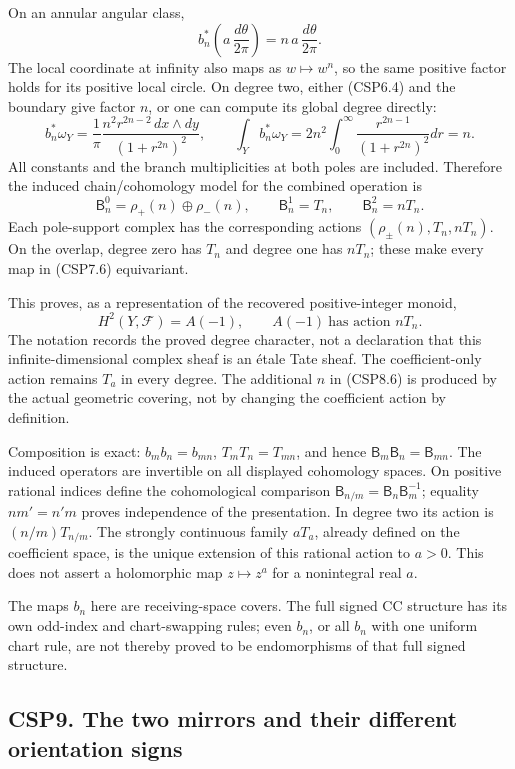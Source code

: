 On an annular angular class, \[
b_n^*\left(a\,\frac{d\theta}{2\pi}\right)
=n\,a\,\frac{d\theta}{2\pi}.
\tag{CSP8.3}
\] The local coordinate at infinity also maps as \(w\mapsto w^n\), so
the same positive factor holds for its positive local circle. On degree
two, either (CSP6.4) and the boundary give factor \(n\), or one can
compute its global degree directly: \[
b_n^*\omega_Y
=\frac1\pi
\frac{n^2r^{2n-2}\,dx\wedge dy}{(1+r^{2n})^2},\qquad
\int_Yb_n^*\omega_Y
=2n^2\int_0^\infty\frac{r^{2n-1}}{(1+r^{2n})^2}dr=n.
\tag{CSP8.4}
\] All constants and the branch multiplicities at both poles are
included. Therefore the induced chain/cohomology model for the combined
operation is \[
\mathsf B_n^0=\rho_+(n)\oplus\rho_-(n),\qquad
\mathsf B_n^1=T_n,\qquad
\mathsf B_n^2=nT_n.
\tag{CSP8.5}
\] Each pole-support complex has the corresponding actions
\((\rho_\pm(n),T_n,nT_n)\). On the overlap, degree zero has \(T_n\) and
degree one has \(nT_n\); these make every map in (CSP7.6) equivariant.

This proves, as a representation of the recovered positive-integer
monoid, \[
\boxed{H^2(Y,\mathscr F)=A(-1),\qquad
A(-1)\ \text{has action }nT_n.}
\tag{CSP8.6}
\] The notation records the proved degree character, not a declaration
that this infinite-dimensional complex sheaf is an étale Tate sheaf. The
coefficient-only action remains \(T_a\) in every degree. The additional
\(n\) in (CSP8.6) is produced by the actual geometric covering, not by
changing the coefficient action by definition.

Composition is exact: \(b_m b_n=b_{mn}\), \(T_mT_n=T_{mn}\), and hence
\(\mathsf B_m\mathsf B_n=\mathsf B_{mn}\). The induced operators are
invertible on all displayed cohomology spaces. On positive rational
indices define the cohomological comparison
\(\mathsf B_{n/m}=\mathsf B_n\mathsf B_m^{-1}\); equality \(nm'=n'm\)
proves independence of the presentation. In degree two its action is
\((n/m)T_{n/m}\). The strongly continuous family \(aT_a\), already
defined on the coefficient space, is the unique extension of this
rational action to \(a>0\). This does not assert a holomorphic map
\(z\mapsto z^a\) for a nonintegral real \(a\).

The maps \(b_n\) here are receiving-space covers. The full signed CC
structure has its own odd-index and chart-swapping rules; even \(b_n\),
or all \(b_n\) with one uniform chart rule, are not thereby proved to be
endomorphisms of that full signed structure.

\subsection{CSP9. The two mirrors and their different orientation
signs}\label{csp9.-the-two-mirrors-and-their-different-orientation-signs}

